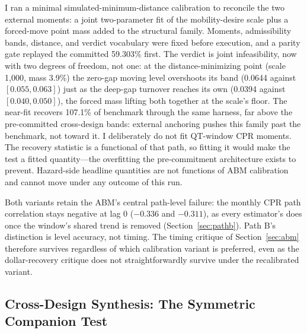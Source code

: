 \documentclass[12pt]{article}
\begin{document}
I ran a minimal simulated-minimum-distance calibration to reconcile the two external moments: a joint two-parameter fit of the mobility-desire scale plus a forced-move point mass added to the structural family. Moments, admissibility bands, distance, and verdict vocabulary were fixed before execution, and a parity gate replayed the committed 59.303\% first. The verdict is joint infeasibility, now with two degrees of freedom, not one: at the distance-minimizing point (scale 1{,}000, mass 3.9\%) the zero-gap moving level overshoots its band (0.0644 against $[0.055, 0.063]$) just as the deep-gap turnover reaches its own (0.0394 against $[0.040, 0.050]$), the forced mass lifting both together at the scale's floor. The near-fit recovers 107.1\% of benchmark through the same harness, far above the pre-committed cross-design bands: external anchoring pushes this family past the benchmark, not toward it. I deliberately do not fit QT-window CPR moments. The recovery statistic is a functional of that path, so fitting it would make the test a fitted quantity---the overfitting the pre-commitment architecture exists to prevent. Hazard-side headline quantities are not functions of ABM calibration and cannot move under any outcome of this run.

Both variants retain the ABM's central path-level failure: the monthly CPR path correlation stays negative at lag 0 ($-0.336$ and $-0.311$), as every estimator's does once the window's shared trend is removed (Section~\ref{sec:pathb}). Path B's distinction is level accuracy, not timing. The timing critique of Section~\ref{sec:abm} therefore survives regardless of which calibration variant is preferred, even as the dollar-recovery critique does not straightforwardly survive under the recalibrated variant.

\subsection{Cross-Design Synthesis: The Symmetric Companion Test}\label{sec:robustness-synthesis}
\end{document}
